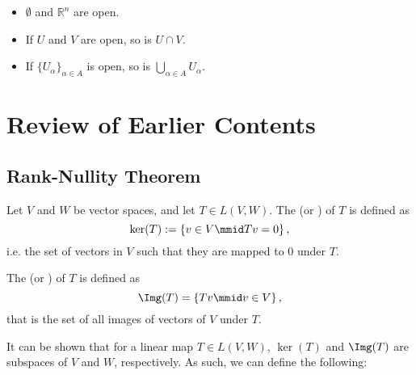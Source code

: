 \documentclass[notoc,notitlepage]{tufte-book}
\begin{document}
\begin{eg}
  \begin{itemize}
    \item $\emptyset$ and $\mathbb{R}^n$ are open.
    \item If $U$ and $V$ are open, so is $U \cap V$.
    \item If $\{ U_\alpha \}_{\alpha \in A}$ is open, so is $\bigcup_{\alpha \in A} U_\alpha$.
  \end{itemize}
\end{eg}



\appendix

\chapter{Review of Earlier Contents}%
\label{chp:review_of_earlier_contents}

\section{Rank-Nullity Theorem}%
\label{sec:rank_nullity_theorem}

\nocite{stephen2002}

\begin{defn}\label{defn:kernel_and_image}
  Let $V$ and $W$ be vector spaces, and let $T \in L(V, W)$.
  The  (or ) of $T$ is defined as
  \begin{equation*}
    \ker(T) := \left\{ v \in V \mmid Tv = 0 \right\},
  \end{equation*}
  i.e. the set of vectors in $V$ such that they are mapped to $0$ under $T$.

  The  (or ) of $T$ is defined as
  \begin{equation*}
    \Img(T) = \left\{ Tv \mmid v \in V \right\},
  \end{equation*}
  that is the set of all images of vectors of $V$ under $T$.
\end{defn}

It can be shown that for a linear map $T \in L(V, W)$,
$\ker (T)$ and $\Img(T)$ are subspaces of $V$ and $W$, respectively.
As such, we can define the following:
\end{document}
